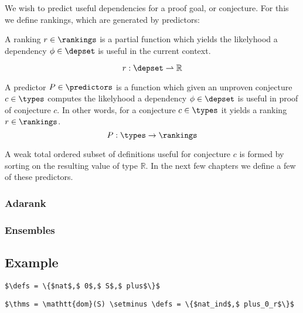 We wish to predict useful dependencies for a proof goal, or conjecture.
For this we define rankings, which are generated by predictors:

\begin{definition}
  A ranking $r \in \rankings$ is a partial function which yields the likelyhood a
  dependency $\phi \in \depset$ is useful in the current context.

  $$
    r : \depset \rightharpoonup \mathbb{R}
  $$
\end{definition}

\begin{definition}
  A predictor $P \in \predictors$ is a function which given an unproven conjecture $c \in \types$
  computes the likelyhood a dependency $\phi \in \depset$ is useful in proof of conjecture $c$.
  In other words, for a conjecture $c \in \types$ it yields a ranking $r \in \rankings$.
  $$
    P : \types \rightarrow \rankings
  $$
\end{definition}

A weak total ordered subset of definitions useful for conjecture $c$ is formed by sorting on the resulting value of type $\mathbb{R}$.
In the next few chapters we define a few of these predictors.

\subsubsection{\knn}


\subsubsection{\knnadaptive}


\subsubsection{\nb}


\subsubsection{Adarank}


\subsubsection{Ensembles}


\subsection{Example}

\begin{lstlisting}[language=Coq, mathescape, frame=none]
$\defs = \{$nat$,$ 0$,$ S$,$ plus$\}$
\end{lstlisting}

\begin{lstlisting}[language=Coq, mathescape, frame=none]
$\thms = \mathtt{dom}(S) \setminus \defs = \{$nat_ind$,$ plus_0_r$\}$
\end{lstlisting}
